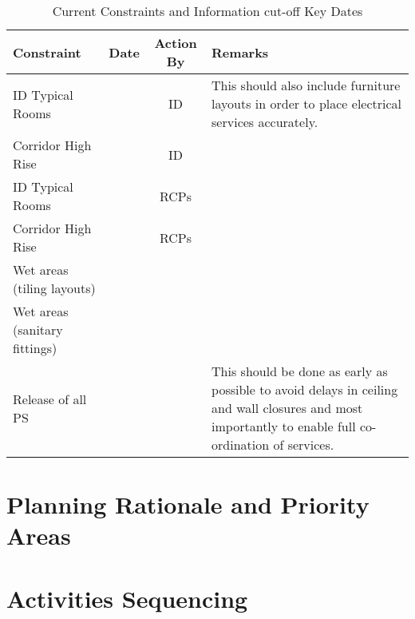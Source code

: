 \begin{table}[h]
\caption{Current Constraints and Information cut-off Key Dates}
\begin{tabular}{llcp{3.8cm}}
\toprule
Constraint         &  Date & Action By & Remarks\\
\midrule
ID Typical Rooms   & & ID& This should also include furniture layouts in order to place electrical services accurately.\\
Corridor High Rise & & ID&     \\
ID Typical Rooms   & & RCPs&   \\
Corridor High Rise & & RCPs&  \\
Wet areas (tiling layouts) & & &\\  
Wet areas (sanitary fittings) & & &\\
Release of all PS  & &      & This should be done as early as possible to avoid delays in ceiling and wall closures and most importantly to enable full co-ordination of services.\\       
\bottomrule
\end{tabular}
\end{table}


\section{Planning Rationale and Priority Areas}



\pagestyle{empty}

\section{Activities Sequencing}


